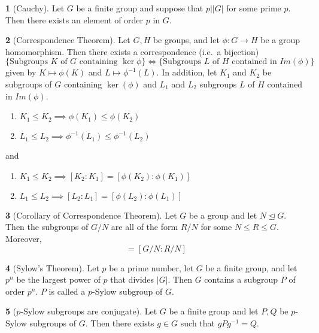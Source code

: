 \documentclass[12pt]{article}
\theoremstyle{definition}
\newtheorem{theorem}{\color{ForestGreen}{\textbf{Theorem}}}
\begin{document}
\begin{theorem}[Cauchy]
Let $G$ be a finite group and suppose that $p \big\vert |G|$ for some prime $p$. Then there exists an element of order $p$ in $G$.
\end{theorem}

\begin{theorem}[Correspondence Theorem]
Let $G, H$ be groups, and let $\phi : G \to H$ be a group homomorphism. Then there exists a correspondence (i.e.\ a bijection)
\begin{equation*}
\{\text{Subgroups $K$ of $G$ containing $\ker \phi$}\} \iff \{\text{Subgroups $L$ of $H$ contained in $Im(\phi)$}\}
\end{equation*}
given by $K \mapsto \phi(K)$ and $L \mapsto \phi^{-1}(L)$. In addition, let $K_1$ and $K_2$ be subgroups of $G$ containing $\ker(\phi)$ and $L_1$ and $L_2$ subgroups $L$ of $H$ contained in $Im(\phi)$.
\begin{enumerate}
\item $K_1 \leq K_2 \implies \phi(K_1) \leq \phi(K_2)$
\item $L_1 \leq L_2 \implies \phi^{-1}(L_1) \leq \phi^{-1}(L_2)$
\end{enumerate}
and
\begin{enumerate}
\item $K_1 \leq K_2 \implies [K_2 : K_1] = [\phi(K_2) : \phi(K_1)]$
\item $L_1 \leq L_2 \implies [L_2 : L_1] = [\phi(L_2) : \phi(L_1)]$
\end{enumerate}
\end{theorem}

\begin{theorem}[Corollary of Correspondence Theorem]
Let $G$ be a group and let $N \trianglelefteq G$. Then the subgroups of $G/N$ are all of the form $R/N$ for some $N\leq R\leq G$. Moreover,
\begin{equation}
[G:R] = [G/N:R/N]
\end{equation}
\end{theorem}

\begin{theorem}[Sylow's Theorem]
Let $p$ be a prime number, let $G$ be a finite group, and let $p^n$ be the largest power of $p$ that divides $
|G|$. Then $G$ contains a subgroup $P$ of order $p^n$. $P$ is called a $p$-Sylow subgroup of $G$.
\end{theorem}

\begin{theorem}[$p$-Sylow subgroups are conjugate]
Let $G$ be a finite group and let $P,Q$ be $p$-Sylow subgroups of $G$. Then there exists $g \in G$ such that $gPg^{-1} = Q$.
\end{theorem}
\end{document}
